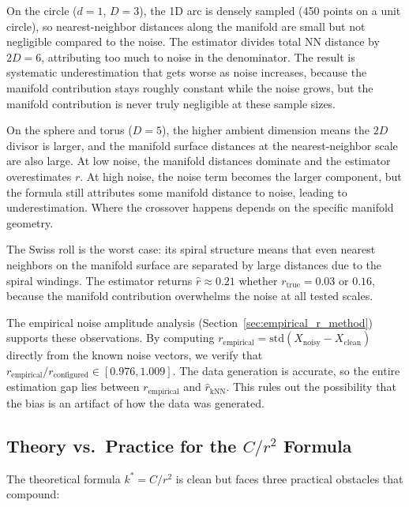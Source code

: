 \documentclass{article}
\begin{document}
On the circle ($d = 1$, $D = 3$), the 1D arc is densely sampled (450 points on a unit circle), so nearest-neighbor distances along the manifold are small but not negligible compared to the noise. The estimator divides total NN distance by $2D = 6$, attributing too much to noise in the denominator. The result is systematic underestimation that gets worse as noise increases, because the manifold contribution stays roughly constant while the noise grows, but the manifold contribution is never truly negligible at these sample sizes.

On the sphere and torus ($D = 5$), the higher ambient dimension means the $2D$ divisor is larger, and the manifold surface distances at the nearest-neighbor scale are also large. At low noise, the manifold distances dominate and the estimator overestimates $r$. At high noise, the noise term becomes the larger component, but the formula still attributes some manifold distance to noise, leading to underestimation. Where the crossover happens depends on the specific manifold geometry.

The Swiss roll is the worst case: its spiral structure means that even nearest neighbors on the manifold surface are separated by large distances due to the spiral windings. The estimator returns $\hat{r} \approx 0.21$ whether $r_{\text{true}} = 0.03$ or $0.16$, because the manifold contribution overwhelms the noise at all tested scales.

The empirical noise amplitude analysis (Section~\ref{sec:empirical_r_method}) supports these observations. By computing $r_{\text{empirical}} = \mathrm{std}(X_{\text{noisy}} - X_{\text{clean}})$ directly from the known noise vectors, we verify that $r_{\text{empirical}} / r_{\text{configured}} \in [0.976, 1.009]$. The data generation is accurate, so the entire estimation gap lies between $r_{\text{empirical}}$ and $\hat{r}_{\text{kNN}}$. This rules out the possibility that the bias is an artifact of how the data was generated.

\subsection{Theory vs.\ Practice for the \texorpdfstring{$C/r^2$}{C/r-squared} Formula}

The theoretical formula $k^* = C/r^2$ is clean but faces three practical obstacles that compound:
\end{document}
